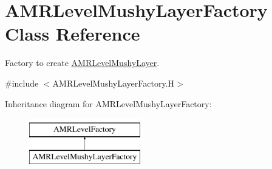 \hypertarget{class_a_m_r_level_mushy_layer_factory}{}\section{A\+M\+R\+Level\+Mushy\+Layer\+Factory Class Reference}
\label{class_a_m_r_level_mushy_layer_factory}


Factory to create \hyperlink{class_a_m_r_level_mushy_layer}{A\+M\+R\+Level\+Mushy\+Layer}.  




{\ttfamily \#include $<$A\+M\+R\+Level\+Mushy\+Layer\+Factory.\+H$>$}

Inheritance diagram for A\+M\+R\+Level\+Mushy\+Layer\+Factory\+:\begin{figure}[H]
\begin{center}
\leavevmode
\includegraphics[height=2.000000cm]{class_a_m_r_level_mushy_layer_factory}
\end{center}
\end{figure}
